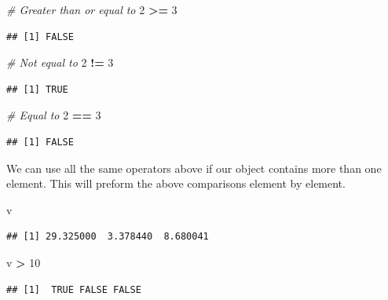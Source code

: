 \documentclass[
]{book}
\newenvironment{Shaded}{\begin{snugshade}}{\end{snugshade}}
\newcommand{\CommentTok}[1]{\textcolor[rgb]{0.56,0.35,0.01}{\textit{#1}}}
\newcommand{\DecValTok}[1]{\textcolor[rgb]{0.00,0.00,0.81}{#1}}
\newcommand{\NormalTok}[1]{#1}
\newcommand{\OperatorTok}[1]{\textcolor[rgb]{0.81,0.36,0.00}{\textbf{#1}}}
\newcommand{\StringTok}[1]{\textcolor[rgb]{0.31,0.60,0.02}{#1}}
\begin{document}
\begin{Shaded}
\begin{Highlighting}[]
\CommentTok{# Greater than or equal to}
\DecValTok{2} \OperatorTok{>=}\StringTok{ }\DecValTok{3}
\end{Highlighting}
\end{Shaded}

\begin{verbatim}
## [1] FALSE
\end{verbatim}

\begin{Shaded}
\begin{Highlighting}[]
\CommentTok{# Not equal to}
\DecValTok{2} \OperatorTok{!=}\StringTok{ }\DecValTok{3}
\end{Highlighting}
\end{Shaded}

\begin{verbatim}
## [1] TRUE
\end{verbatim}

\begin{Shaded}
\begin{Highlighting}[]
\CommentTok{# Equal to}
\DecValTok{2} \OperatorTok{==}\StringTok{ }\DecValTok{3}
\end{Highlighting}
\end{Shaded}

\begin{verbatim}
## [1] FALSE
\end{verbatim}

We can use all the same operators above if our object contains more than one element. This will preform the above comparisons element by element.

\begin{Shaded}
\begin{Highlighting}[]
\NormalTok{v}
\end{Highlighting}
\end{Shaded}

\begin{verbatim}
## [1] 29.325000  3.378440  8.680041
\end{verbatim}

\begin{Shaded}
\begin{Highlighting}[]
\NormalTok{v }\OperatorTok{>}\StringTok{ }\DecValTok{10}
\end{Highlighting}
\end{Shaded}

\begin{verbatim}
## [1]  TRUE FALSE FALSE
\end{verbatim}
\end{document}
